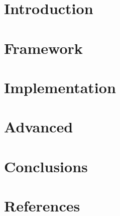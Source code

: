\section[Intro]{Introduction}


\section[Framework]{Framework}


\section[Impl]{Implementation}


\section[Adv]{Advanced}



\section[Concl]{Conclusions}


\section[Refs]{References}

